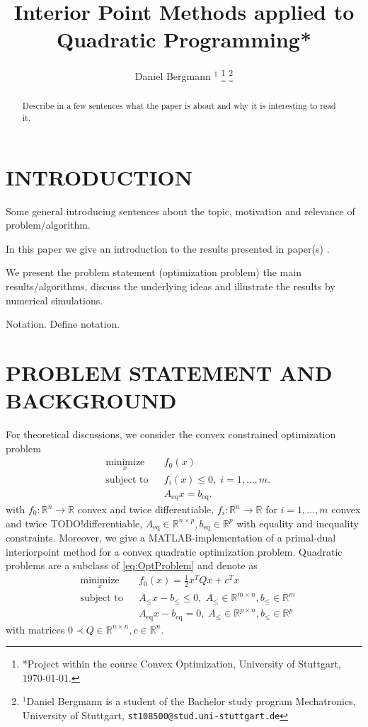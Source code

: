 \documentclass[letterpaper, 10 pt, conference]{ieeeconf}  %
\title{\LARGE \bf Interior Point Methods applied to Quadratic Programming*}
\author{Daniel Bergmann $^{1}$%
\thanks{*Project within the course Convex Optimization, University of Stuttgart, \today.}%
\thanks{$^{1}$Daniel Bergmann is a student of the Bachelor study program Mechatronics, University of Stuttgart,
        {\tt\small st108500@stud.uni-stuttgart.de}}%
}
\newcommand{\R}{\mathbb{R}}
\newcommand{\Rn}{\mathbb{R}^n}
\newcommand{\Rm}{\mathbb{R}^m}
\newcommand{\Rp}{\mathbb{R}^p}
\newcommand{\todo}{{\color{red} TODO!}}
\newcommand{\ind}[2]{{#1}_{\mathrm{#2}}}
\newcommand{\Aeq}{\ind{A}{eq}}
\newcommand{\beq}{\ind{b}{eq}}
\newcommand{\Aineq}{\ind{A}{\leq}}
\newcommand{\bineq}{\ind{b}{\leq}}
\newcommand{\trp}{^T}
\newcommand{\matlab}{MATLAB}
\newcommand{\OptProblem}{
	\begin{aligned}
	& \underset{x}{\text{minimize}}
	& & f_0(x) \\
	& \text{subject to}
	& & f_i(x) \leq 0, \; i = 1, \ldots, m.\\
	& & &\Aeq x = \beq.
	\end{aligned}
	}
\newcommand{\OptProblemquad}{
	\begin{aligned}
		& \underset{x}{\text{minimize}}
		& & f_0(x) =\frac{1}{2} x\trp Q x + c\trp x\\
		& \text{subject to}
		& & \Aineq x - \bineq \leq 0, \; \Aineq \in \R^{m\times n}, \bineq \in \Rm\\
		& & &\Aeq x - \beq = 0, \;  \Aineq \in \R^{p\times n}, \bineq \in \Rp
	\end{aligned}
}
\begin{document}
\maketitle
\thispagestyle{empty}
\pagestyle{empty}


\begin{abstract}

Describe in a few sentences what the paper is about and why it is interesting 
to read it.

\end{abstract}


\section{INTRODUCTION}

Some general introducing sentences about the topic, motivation and relevance of problem/algorithm.

In this paper we give an introduction to the results presented in paper(s) \cite{Bro-14}.



We present the problem statement (optimization problem)
the main results/algorithms, discuss the underlying ideas and illustrate the results 
by numerical simulations.

Notation. Define notation.

\section{PROBLEM STATEMENT AND BACKGROUND}
For theoretical discussions, we consider the convex constrained optimization problem
\begin{equation}
\OptProblem
\label{eq:OptProblem}
\end{equation}
with $ f_0:\Rn \longrightarrow \R $ convex and twice differentiable, $ f_i:\Rn \longrightarrow \R $ for $ i=1,\dots,m $ convex and twice \todo differentiable,
$ \Aeq \in \R^{n\times p}, \beq \in  \R^p $ with equality and inequality constraints.
Moreover, we give a \matlab-implementation of a primal-dual interiorpoint method for a convex quadratic optimization problem. Quadratic problems are a subclass of \eqref{eq:OptProblem} and denote as
\begin{equation}
	\OptProblemquad
	\label{eq:QuadProblem}
\end{equation}
with matrices $ 0 \prec Q\in \R^{n \times n}, c\in \Rn. $
\end{document}
